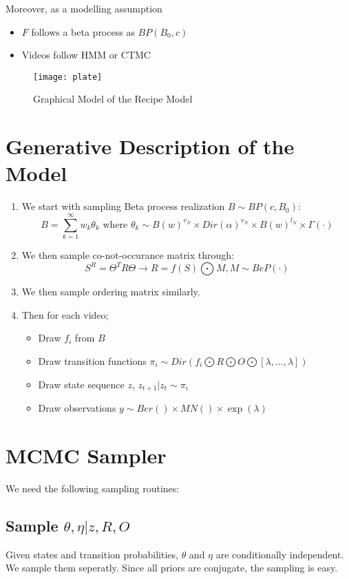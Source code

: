 \documentclass{article}
\begin{document}
Moreover, as a modelling assumption
\begin{itemize}
  \item $F$ follows a beta process as $BP(B_0,c)$
  \item Videos follow HMM or CTMC
\end{itemize}

\begin{figure}
  \texttt{[image: plate]}
\caption{Graphical Model of the Recipe Model}
\end{figure}

\section{Generative Description of the Model}
\begin{enumerate}
  \item We start with sampling Beta process realization $B\sim BP(c,B_0)$:
  \begin{equation}
    B = \sum_{k=1}^\infty w_k \theta_k \text{ where } \theta_k \sim B(w)^{v_N} \times Dir(\alpha)^{v_N} \times B(w)^{l_N} \times \Gamma(\cdot)
  \end{equation}
  \item We then sample co-not-occurance matrix through:
  \begin{equation}
    S^R = \Theta^T R \Theta  \rightarrow R = f(S) \bigodot M, M \sim  BeP(\cdot)
  \end{equation}
  \item We then sample ordering matrix similarly.
  \item Then for each video;
  \begin{itemize}
    \item Draw $f_i$ from $B$
    \item Draw transition functions $\pi_i \sim Dir(f_i \bigodot R \bigodot O \bigodot [\lambda,\ldots,\lambda])$
    \item Draw state sequence $z$, $z_{t+1}|z_{t} \sim \pi_i$
    \item Draw observations $y \sim Ber()\times MN() \times \exp(\lambda)$
  \end{itemize}
\end{enumerate}


\section{MCMC Sampler}
We need the following sampling routines:
\subsection{Sample $\theta,\eta|z,R,O$}
Given states and transition probabilities, $\theta$ and $\eta$ are conditionally independent. We sample them seperatly. Since all priors are conjugate, the sampling is easy.
\end{document}
